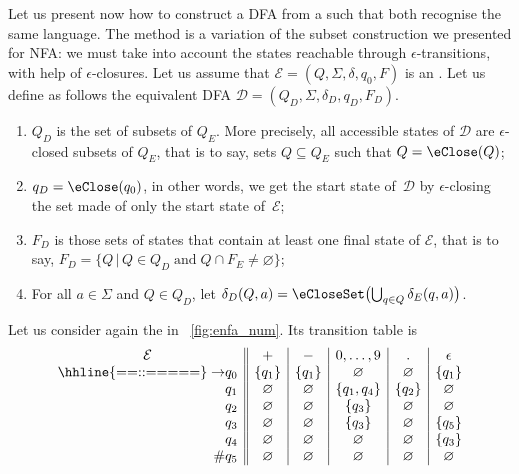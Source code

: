 Let us present now how to construct a DFA from a \eNFA such that both
recognise the same language. The method is a variation of the subset
construction we presented for NFA: we must take into account the
states reachable through \(\epsilon\)-transitions, with help of
\(\epsilon\)-closures. Let us assume that \(\mathcal{E} = (Q, \Sigma,
\delta, q_0, F)\) is an \eNFA. Let us define as follows the equivalent
DFA \(\mathcal{D} = (Q_D, \Sigma, \delta_D, q_D, F_D)\).
\begin{enumerate}

  \item \(Q_D\) is the set of subsets of \(Q_E\). More precisely, all
    accessible states of \(\mathcal{D}\) are \(\epsilon\)-closed
    subsets of \(Q_E\), that is to say, sets \(Q \subseteq Q_E\) such
    that \(Q = \eClose(Q)\);

  \item \(q_D = \eClose (q_0)\), in other words, we get the start
    state of~\(\mathcal{D}\) by \(\epsilon\)-closing the set made of
    only the start state of~\(\mathcal{E}\);

  \item \(F_D\) is those sets of states that contain at least one
    final state of \(\mathcal{E}\), that is to say, \(F_D = \{Q \,
    \lvert \, Q \in Q_D \; \text{and} \; Q \cap F_E \neq
    \varnothing\}\);

  \item For all \(a \in \Sigma\) and \(Q \in Q_D\), let \(\delta_D (Q,
    a) = \eCloseSet \bigl(\bigcup_{q \in Q}{\delta_E (q,
      a)}\bigr)\).

\end{enumerate}
Let us consider again the \eNFA in \fig~\vref{fig:enfa_num}. Its
transition table is
\begin{equation*}
\begin{array}{r@{}l||c|c|c|c|c}
\multicolumn{2}{c||}{\mathcal{E}} & + & - & 0, \ldots, 9 & \mathtt{.} &
\epsilon\\
\hhline{==::=====}
\rightarrow & q_0 & \{q_1\} & \{q_1\} & \varnothing & \varnothing
                  & \{q_1\}\\
            & q_1 & \varnothing  & \varnothing & \{q_1, q_4\}
                  & \{q_2\} & \varnothing\\
            & q_2 & \varnothing  & \varnothing & \{q_3\} & \varnothing
                  & \varnothing\\
            & q_3 & \varnothing & \varnothing & \{q_3\} & \varnothing
                  & \{q_5\}\\
            & q_4 & \varnothing & \varnothing & \varnothing
                  & \varnothing & \{q_3\}\\
         \# & q_5 & \varnothing & \varnothing & \varnothing
                  & \varnothing & \varnothing
\end{array}
\end{equation*}
